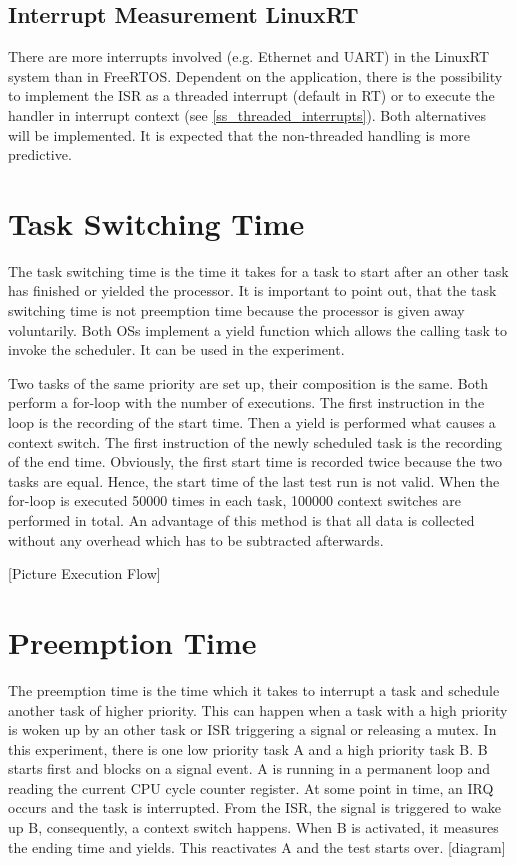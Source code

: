 \subsection{Interrupt Measurement LinuxRT}
There are more interrupts involved (e.g. Ethernet and \ac{UART}) in the LinuxRT system than in FreeRTOS.
Dependent on the application, there is the possibility to implement the \ac{ISR} as a threaded interrupt (default in RT) or to execute the handler in interrupt context (see \ref{ss_threaded_interrupts}).
Both alternatives will be implemented.
It is expected that the non-threaded handling is more predictive.


\section{Task Switching Time} 
The task switching time is the time it takes for a task to start after an other task has finished or yielded the processor.
It is important to point out, that the task switching time is not preemption time because the processor is given away voluntarily.
Both \acp{OS} implement a yield function which allows the calling task to invoke the scheduler.
It can be used in the experiment.
\par
Two tasks of the same priority are set up, their composition is the same. 
Both perform a for-loop with the number of executions.
The first instruction in the loop is the recording of the start time.
Then a yield is performed what causes a context switch. 
The first instruction of the newly scheduled task is the recording of the end time.
Obviously, the first start time is recorded twice because the two tasks are equal.
Hence, the start time of the last test run is not valid.
When the for-loop is executed 50000 times in each task, 100000 context switches are performed in total.
An advantage of this method is that all data is collected without any overhead which has to be subtracted afterwards.

[Picture Execution Flow]
 
\section{Preemption Time}
The preemption time is the time which it takes to interrupt a task and schedule another task of higher priority.
This can happen when a task with a high priority is woken up by an other task or \ac{ISR} triggering a signal or releasing a mutex.
In this experiment, there is one low priority task A and a high priority task B.
B starts first and blocks on a signal event.
A is running in a permanent loop and reading the current \ac{CPU} cycle counter register.
At some point in time, an \ac{IRQ} occurs and the task is interrupted.
From the \ac{ISR}, the signal is triggered to wake up B, consequently, a context switch happens.
When B is activated, it measures the ending time and yields.
This reactivates A and the test starts over.
[diagram]

